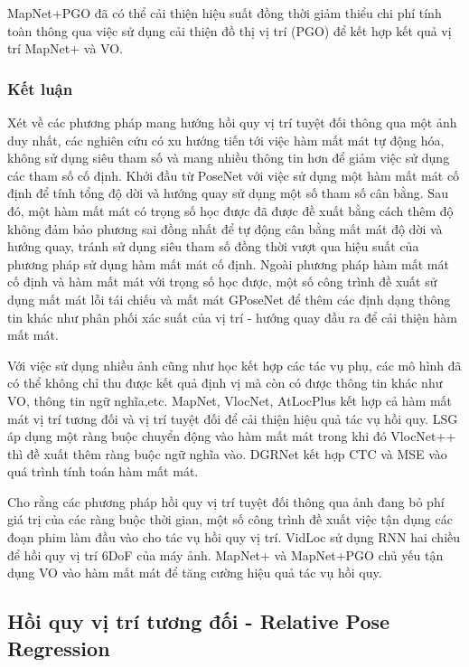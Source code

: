 MapNet+PGO đã có thể cải thiện hiệu suất đồng thời giảm thiểu chi phí tính toàn thông qua việc sử dụng cải thiện đồ thị vị trí (PGO) để kết hợp kết quả vị trí MapNet+ và VO.

\subsubsection*{Kết luận}
Xét về các phương pháp mang hướng hồi quy vị trí tuyệt đối thông qua một ảnh duy nhất, các nghiên cứu có xu hướng tiến tới việc hàm mất mát tự động hóa, không sử dụng siêu tham số và mang nhiều thông tin hơn để giảm việc sử dụng các tham số cố định. Khởi đầu từ PoseNet với việc sử dụng một hàm mất mát cố định để tính tổng độ dời và hướng quay sử dụng một số tham số cân bằng. Sau đó, một hàm mất mát có trọng số học được \cite{wang2019atloc, bui2019adversarial} đã được đề xuất bằng cách thêm độ không đảm bảo phương sai đồng nhất để tự động cân bằng mất mát độ dời và hướng quay, tránh sử dụng siêu tham số đồng thời vượt qua hiệu suất của phương pháp sử dụng hàm mất mát cố định. Ngoài phương pháp hàm mất mát cố định và hàm mất mát với trọng số học được, một số công trình \cite{kendall2017geometric, Cai2018AHP} đề xuất sử dụng mất mát lỗi tái chiếu và mất mát GPoseNet để thêm các định dạng thông tin khác như phân phối xác suất của vị trí - hướng quay đầu ra để cải thiện hàm mất mát. 

Với việc sử dụng nhiều ảnh cũng như học kết hợp các tác vụ phụ, các mô hình đã có thể không chỉ thu được kết quả định vị mà còn có được thông tin khác như VO, thông tin ngữ nghĩa,etc. MapNet, VlocNet, AtLocPlus \cite{wang2019atloc} kết hợp cả hàm mất mát vị trí tương đối và vị trí tuyệt đối để cải thiện hiệu quả tác vụ hồi quy. LSG \cite{xue2019local} áp dụng một ràng buộc chuyển động vào hàm mất mát trong khi đó VlocNet++ \cite{Radwan_2018} thì đề xuất thêm ràng buộc ngữ nghĩa vào. DGRNet \cite{lin2019deep} kết hợp CTC và MSE vào quá trình tính toán hàm mất mát.

Cho rằng các phương pháp hồi quy vị trí tuyệt đối thông qua ảnh đang bỏ phí giá trị của các ràng buộc thời gian, một số công trình \cite{clark2017vidloc, brahmbhatt2018geometryaware} đề xuất việc tận dụng các đoạn phim làm đầu vào cho tác vụ hồi quy vị trí. VidLoc \cite{clark2017vidloc} sử dụng RNN hai chiều để hồi quy vị trí 6DoF của máy ảnh. MapNet+ và MapNet+PGO \cite{brahmbhatt2018geometryaware} chủ yếu tận dụng VO vào hàm mất mát để tăng cường hiệu quả tác vụ hồi quy.

\subsection{Hồi quy vị trí tương đối - Relative Pose Regression}

